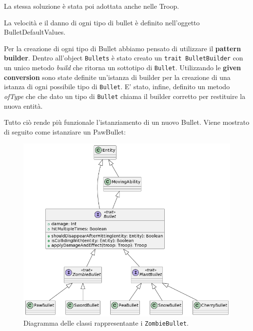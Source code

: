 

La stessa soluzione è stata poi adottata anche nelle Troop.

La velocità e il danno di ogni tipo di bullet è definito nell'oggetto BulletDefaultValues.

Per la creazione di ogni tipo di Bullet abbiamo pensato di utilizzare il \textbf{pattern builder}.
Dentro all'object \texttt{Bullets} è stato creato un \texttt{trait BulletBuilder}
con un unico metodo \textit{build} che ritorna un sottotipo di \texttt{Bullet}.
Utilizzando le \textbf{given conversion} sono state definite un'istanza di builder per la creazione di una istanza
di ogni possibile tipo di \texttt{Bullet}.
E' stato, infine, definito un metodo \textit{ofType} che che dato un tipo
di \texttt{Bullet} chiama il builder corretto per restituire la nuova entità.



Tutto ciò rende più funzionale l'istanziamento di un nuovo Bullet.
Viene mostrato di seguito come istanziare un PawBullet:



\begin{figure}[H]
    \centering
    \includegraphics[width=1\linewidth]{images/model-bullet}
    \caption{Diagramma delle classi rappresentante i \texttt{ZombieBullet}.}
    \label{fig:class-bullet}
\end{figure}

